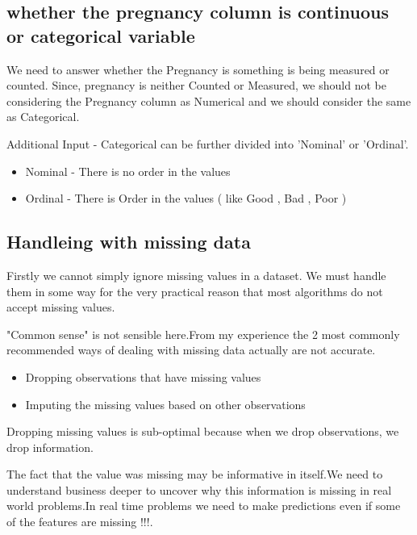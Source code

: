 \documentclass[11pt,en]{elegantpaper}
\begin{document}


\subsection{whether the pregnancy column is continuous or categorical variable}
We need to answer whether the Pregnancy is something is being measured or counted. Since, pregnancy is neither Counted or Measured, we should not be considering the Pregnancy column as Numerical and we should consider the same as Categorical.

Additional Input - Categorical can be further divided into 'Nominal' or 'Ordinal'.
\begin{itemize}
    \item Nominal - There is no order in the values
    \item Ordinal - There is Order in the values ( like Good , Bad , Poor )
\end{itemize}

\subsection{Handleing with missing data}
Firstly we cannot simply ignore missing values in a dataset. We must handle them in some way for the very practical reason that most algorithms do not accept missing values.

"Common sense" is not sensible here.From my experience the 2 most commonly recommended ways of dealing with missing data actually are not accurate.
\begin{itemize}
    \item Dropping observations that have missing values
    \item Imputing the missing values based on other observations
\end{itemize}

Dropping missing values is sub-optimal because when we drop observations, we drop information.

The fact that the value was missing may be informative in itself.We need to understand business deeper to uncover why this information is missing in real world problems.In real time problems we need to make predictions even if some of the features are missing !!!.
\end{document}

